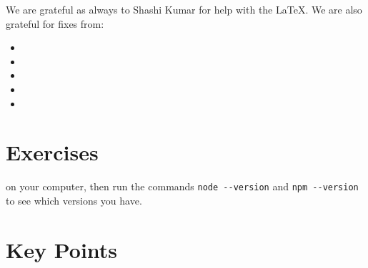 We are grateful as always to Shashi Kumar for help with the LaTeX.
We are also grateful for fixes from:

\begin{itemize}
\item
\item
\item
\item
\item
\end{itemize}

\section{Exercises}\label{s:intro-exercises}


 on your computer,
then run the commands \texttt{node\ -\/-version} and \texttt{npm\ -\/-version}
to see which versions you have.

\section*{Key Points}



